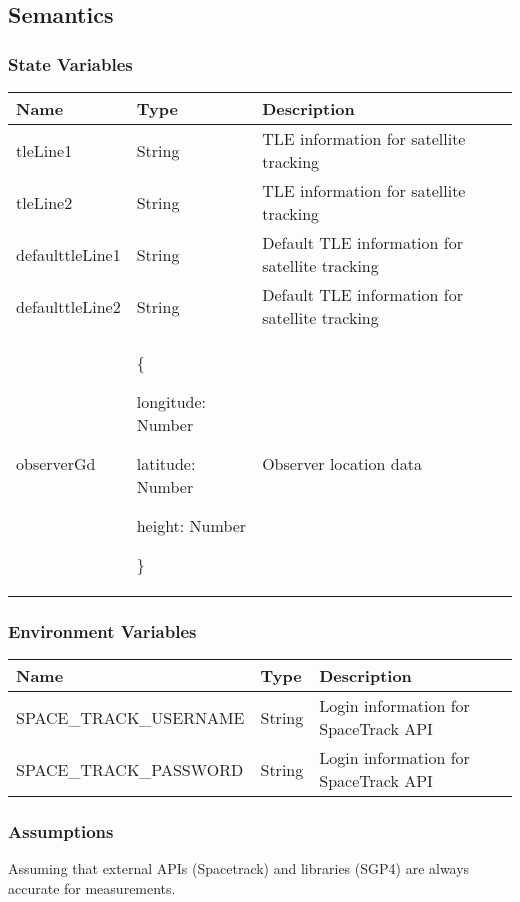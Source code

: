 \documentclass[12pt, titlepage]{article}
\begin{document}
\subsection{Semantics}


 
\subsubsection{State Variables}
\begin{center}
\begin{tabular}{|p{4cm} |p{3cm} |p{5cm}|}
\hline
\textbf{Name} & \textbf{Type} & \textbf{Description} \\
\hline
tleLine1 & String & TLE information for satellite tracking \\
\hline
tleLine2 & String & TLE information for satellite tracking \\
\hline
defaulttleLine1 & String & Default TLE information for satellite tracking \\
\hline
defaulttleLine2 & String & Default TLE information for satellite tracking \\
\hline
observerGd & \{

longitude: Number

latitude: Number

height: Number

\} & Observer location data \\
\hline
\end{tabular}

\end{center}

\subsubsection{Environment Variables}
\begin{center}
\begin{tabular}{|p{7cm} |p{3cm} |p{5cm}|}
\hline
\textbf{Name} & \textbf{Type} & \textbf{Description} \\
\hline
SPACE\_TRACK\_USERNAME & String & Login information for SpaceTrack API \\
\hline
SPACE\_TRACK\_PASSWORD & String & Login information for SpaceTrack API \\
\hline
\end{tabular}
\end{center}

 
\subsubsection{Assumptions}
Assuming that external APIs (Spacetrack) and libraries (SGP4) are always accurate for measurements.
\end{document}

